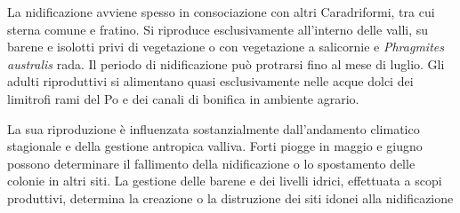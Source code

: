 La nidificazione avviene spesso in consociazione con altri Caradriformi,
tra cui sterna comune e fratino. Si riproduce esclusivamente
all{\textquoteright}interno delle valli, su barene e isolotti privi di
vegetazione o con vegetazione a salicornie e \textit{Phragmites
australis} rada. Il periodo di nidificazione pu\`o protrarsi fino al
mese di luglio. Gli adulti riproduttivi si alimentano quasi
esclusivamente nelle acque dolci dei limitrofi rami del Po e dei canali
di bonifica in ambiente agrario.

La sua riproduzione \`e influenzata sostanzialmente
dall{\textquoteright}andamento climatico stagionale e della gestione
antropica valliva. Forti piogge in maggio e giugno possono determinare
il fallimento della nidificazione o lo spostamento delle colonie in
altri siti. La gestione delle barene e dei livelli idrici, effettuata a
scopi produttivi, determina la creazione o la distruzione dei siti
idonei alla nidificazione

\begin{adjustwidth}{-3.5cm}{-1cm}
\begin{table}[!h]
\centering
\footnotesize
{}
\caption{Numero di coppie nidificanti di sterna zampenere nel delta del Po veneto}
\label{Verza_tab_1}
\end{table}
\end{adjustwidth}

